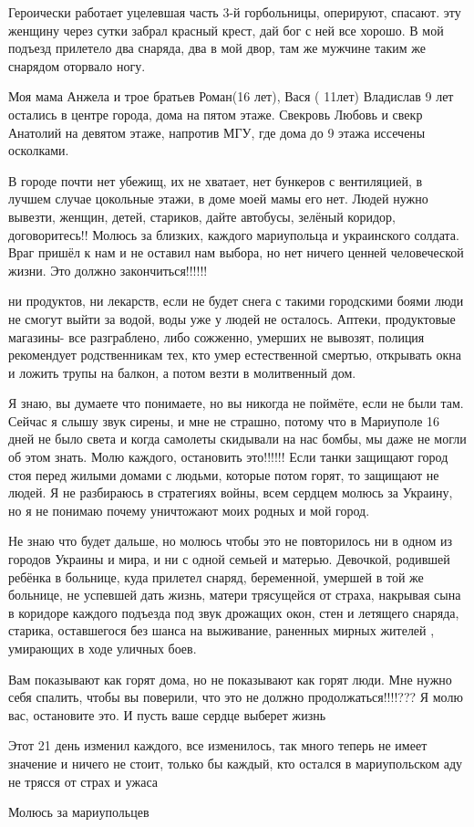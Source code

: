 Героически работает уцелевшая часть 3-й горбольницы, оперируют, спасают. эту
женщину через сутки забрал красный крест, дай бог с ней все хорошо. В мой
подъезд прилетело два снаряда, два в мой двор, там же мужчине таким же снарядом
оторвало ногу.

Моя мама Анжела и трое братьев Роман(16 лет), Вася ( 11лет) Владислав 9 лет
остались в центре города, дома на пятом этаже. Свекровь Любовь и свекр Анатолий
на девятом этаже, напротив МГУ, где дома до 9 этажа иссечены осколками.

В городе почти нет убежищ, их не хватает, нет бункеров с вентиляцией, в лучшем
случае цокольные этажи, в доме моей мамы его нет. Людей нужно вывезти, женщин,
детей, стариков, дайте автобусы, зелёный коридор, договоритесь!! Молюсь за
близких, каждого мариупольца и украинского солдата. Враг пришёл к нам и не
оставил нам выбора, но нет ничего ценней человеческой жизни. Это должно
закончиться!!!!!!

ни продуктов, ни лекарств, если не будет снега с такими городскими боями люди
не смогут выйти за водой, воды уже у людей не осталось. Аптеки, продуктовые
магазины- все разграблено, либо сожженно, умерших не вывозят, полиция
рекомендует родственникам тех, кто умер естественной смертью, открывать окна и
ложить трупы на балкон, а потом везти в молитвенный дом.

Я знаю, вы думаете что понимаете, но вы никогда не поймёте, если не были там.
Сейчас я слышу звук сирены, и мне не страшно, потому что в Мариуполе 16 дней не
было света и когда самолеты скидывали на нас бомбы, мы даже не могли об этом
знать. Молю каждого, остановить это!!!!!! Если танки защищают город стоя перед
жилыми домами с людьми, которые потом горят, то защищают не людей. Я не
разбираюсь в стратегиях войны, всем сердцем молюсь за Украину, но я не понимаю
почему уничтожают моих родных и мой город. 

Не знаю что будет дальше, но молюсь чтобы это не повторилось ни в одном из
городов Украины и мира, и ни с одной семьей и матерью. Девочкой, родившей
ребёнка в больнице, куда прилетел снаряд, беременной, умершей в той же
больнице, не успевшей дать жизнь, матери трясущейся от страха, накрывая сына в
коридоре каждого подъезда под звук дрожащих окон, стен и летящего снаряда,
старика, оставшегося без шанса на выживание, раненных мирных жителей ,
умирающих в ходе уличных боев. 

Вам показывают как горят дома, но не показывают как горят люди. Мне нужно себя
спалить, чтобы вы поверили, что это не должно продолжаться!!!!??? Я молю вас,
остановите это. И пусть ваше сердце выберет жизнь 

Этот 21 день изменил каждого, все изменилось, так много теперь не имеет
значение и ничего не стоит, только бы каждый, кто остался в мариупольском аду
не трясся от страх и ужаса

Молюсь за мариупольцев🙏

